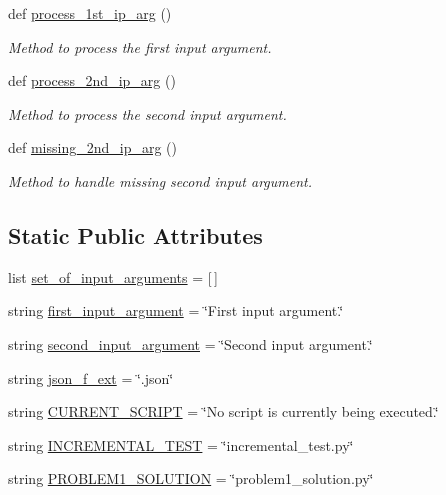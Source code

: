\begin{DoxyCompactItemize}
def \hyperlink{classutilities_1_1queue__ip__arguments_1_1queue__ip__args_ae1fc6d7af2e429d0656dbf388711db94}{process\+\_\+1st\+\_\+ip\+\_\+arg} ()
\begin{DoxyCompactList}\small\item\em Method to process the first input argument. \end{DoxyCompactList}\item 
def \hyperlink{classutilities_1_1queue__ip__arguments_1_1queue__ip__args_a82d245379c48196f61d4268882dd5c6d}{process\+\_\+2nd\+\_\+ip\+\_\+arg} ()
\begin{DoxyCompactList}\small\item\em Method to process the second input argument. \end{DoxyCompactList}\item 
def \hyperlink{classutilities_1_1queue__ip__arguments_1_1queue__ip__args_a4420d4d6a1272816131b5426bfaf678e}{missing\+\_\+2nd\+\_\+ip\+\_\+arg} ()
\begin{DoxyCompactList}\small\item\em Method to handle missing second input argument. \end{DoxyCompactList}\end{DoxyCompactItemize}
\subsection*{Static Public Attributes}
\begin{DoxyCompactItemize}
\item 
list \hyperlink{classutilities_1_1queue__ip__arguments_1_1queue__ip__args_acc8e7685be71a7f95ede7c980355c9f3}{set\+\_\+of\+\_\+input\+\_\+arguments} = \mbox{[}$\,$\mbox{]}
\item 
string \hyperlink{classutilities_1_1queue__ip__arguments_1_1queue__ip__args_a14394c9820086e09d5b926d9910a180f}{first\+\_\+input\+\_\+argument} = \char`\"{}First input argument.\char`\"{}
\item 
string \hyperlink{classutilities_1_1queue__ip__arguments_1_1queue__ip__args_a0b179a70c0e57de2794d0d532e534c9c}{second\+\_\+input\+\_\+argument} = \char`\"{}Second input argument.\char`\"{}
\item 
string \hyperlink{classutilities_1_1queue__ip__arguments_1_1queue__ip__args_a8d93f9ade7608583602a9948c0d744f7}{json\+\_\+f\+\_\+ext} = \char`\"{}.json\char`\"{}
\item 
string \hyperlink{classutilities_1_1queue__ip__arguments_1_1queue__ip__args_a453711109bd635e6263a99c8e85e3dff}{C\+U\+R\+R\+E\+N\+T\+\_\+\+S\+C\+R\+I\+P\+T} = \char`\"{}No script is currently being executed.\char`\"{}
\item 
string \hyperlink{classutilities_1_1queue__ip__arguments_1_1queue__ip__args_a849b659d7a9d7689c4c707502d1684d5}{I\+N\+C\+R\+E\+M\+E\+N\+T\+A\+L\+\_\+\+T\+E\+S\+T} = \char`\"{}incremental\+\_\+test.\+py\char`\"{}
\item 
string \hyperlink{classutilities_1_1queue__ip__arguments_1_1queue__ip__args_ad61d6e7f7e2602c0f1c11a8fdf2b7168}{P\+R\+O\+B\+L\+E\+M1\+\_\+\+S\+O\+L\+U\+T\+I\+O\+N} = \char`\"{}problem1\+\_\+solution.\+py\char`\"{}
\end{DoxyCompactItemize}


